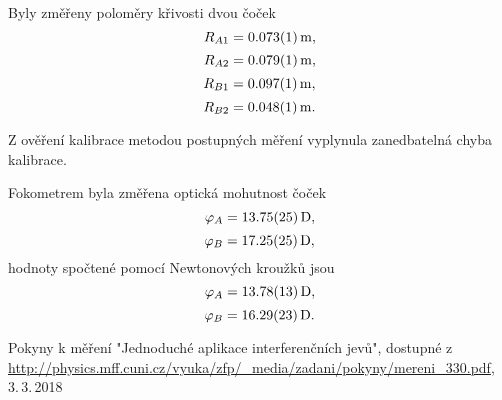 \documentclass{protokol}
\begin{document}
    Byly změřeny poloměry křivosti dvou čoček 
    $$ R_{A1} = \SI{0.073 \pm 0.001}{m}, $$
    $$ R_{A2} = \SI{0.079 \pm 0.001}{m}, $$
    $$ R_{B1} = \SI{0.097 \pm 0.001}{m}, $$
    $$ R_{B2} = \SI{0.048 \pm 0.001}{m}. $$

    Z ověření kalibrace metodou postupných měření vyplynula zanedbatelná chyba kalibrace.

    Fokometrem byla změřena optická mohutnost čoček 
    $$ \varphi_A = \SI{13.75 \pm 0.25}{D}, $$
    $$ \varphi_B = \SI{17.25 \pm 0.25}{D}, $$
    hodnoty spočtené pomocí Newtonových kroužků jsou
    $$ \varphi_A = \SI{13.78 \pm 0.13}{D}, $$
    $$ \varphi_B = \SI{16.29 \pm 0.23}{D}. $$
    
  \begin{thebibliography}{}

    Pokyny k měření "Jednoduché aplikace interferenčních jevů", dostupné z\\ \url{http://physics.mff.cuni.cz/vyuka/zfp/_media/zadani/pokyny/mereni_330.pdf}, 3.\,3.\,2018
  
  \end{thebibliography}
\end{document}
